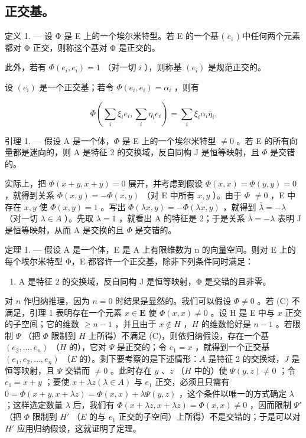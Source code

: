 \subsection{正交基。}

定义 1. --- 设 Φ 是 E 上的一个埃尔米特型。若 E 的一个基 ( \(e_{i}\) ) 中任何两个元素都对 Φ 正交，则称这个基对 Φ 是正交的。

此外，若有 \(\Phi(e_i, e_i) = 1\) （对一切 \(i\) ），则称基 \((e_i)\) 是规范正交的。

设 \((e_i)\) 是一个正交基；若令 \(\Phi(e_i, e_i) = \alpha_i\) ，则有

\[
\Phi (\sum_ {i} \xi_ {i} e _ {i}, \sum_ {i} \eta_ {i} e _ {i}) = \sum_ {i} \xi_ {i} \alpha_ {i} \overline {{\eta}} _ {i}.\tag{1}
\]

引理 1. --- 假设 A 是一个体，\(\Phi\) 是 E 上的一个埃尔米特型 \(\neq 0\) 。若 E 的所有向量都是迷向的，则 A 是特征 2 的交换域，反自同构 J 是恒等映射，且 \(\Phi\) 是交错的。

实际上，把 \(\Phi(x+y, x+y)=0\) 展开，并考虑到假设 \(\Phi(x,x)=\Phi(y,y)=0\) ，就得到关系 \(\Phi(x,y)=-\overline{\Phi(x,y)}\) （对 E 中所有 \(x,y\) ）。由于 \(\Phi\) \(\neq 0\) ，E 中存在 \(x,y\) 使 \(\Phi(x,y)=1\) 。写出 \(\Phi(\lambda x,y)=-\overline{\Phi(\lambda x,y)}\) ，就得到 \(\bar{\lambda}=-\lambda\) （对一切 \(\lambda\in A\) ）。先取 \(\lambda=1\) ，就看出 A 的特征是 2；于是关系 \(\bar{\lambda}=-\lambda\) 表明 J 是恒等映射，从而 A 是交换的且 \(\Phi\) 是交错的。

定理 1. --- 假设 A 是一个体，E 是 A 上有限维数为 n 的向量空间。则对 E 上的每个埃尔米特型 Φ，E 都容许一个正交基，除非下列条件同时满足：

\begin{enumerate}
\def\labelenumi{(\Alph{enumi})}
\setcounter{enumi}{2}
\tightlist
\item
  A 是特征 2 的交换域，反自同构 J 是恒等映射，Φ 是交错的且非零。
\end{enumerate}

对 \(n\) 作归纳推理，因为 \(n=0\) 时结果是显然的。我们可以假设 \(\Phi\neq0\) 。若 (C) 不满足，引理 1 表明存在一个元素 \(x\in\mathbf{E}\) 使 \(\Phi(x,x)\neq0\) 。设 H 是 E 中与 \(x\) 正交的子空间；它的维数 \(\geqslant n-1\) ，并且由于 \(x \notin H\) ，\(H\) 的维数恰好是 \(n-1\) 。若限制 \(\Psi\) （把 \(\Phi\) 限制到 \(H\) 上所得）不满足 (C)，则依归纳假设，存在一个基 \((e_2, \ldots, e_n)\) （\(H\) 的），它对 \(\Psi\) 是正交的；令 \(e_1 = x\) ，就得到一个正交基 \((e_1, e_2, \ldots, e_n)\) （\(E\) 的）。剩下要考察的是下述情形：\(A\) 是特征 2 的交换域，\(J\) 是恒等映射，且 \(\Psi\) 交错而 \(\neq 0\) 。此时存在 \(y\) 、\(z\) （\(H\) 中的）使 \(\Psi(y, z) \neq 0\) ；令 \(e_1 = x + y\) ；要使 \(x + \lambda z (\lambda \in A)\) 与 \(e_1\) 正交，必须且只需有 \(0 = \Phi(x + y, x + \lambda z) = \Phi(x, x) + \lambda \Psi(y, z)\) ，这个条件以唯一的方式确定 \(\lambda\) ；这样选定数量 \(\lambda\) 后，我们有 \(\Phi(x + \lambda z, x + \lambda z) = \Phi(x, x) \neq 0\) ，因而限制 \(\Psi'\) （把 \(\Phi\) 限制到 \(H'\) （\(E\) 的与 \(e_1\) 正交的子空间）上所得）不是交错的；于是可以对 \(H'\) 应用归纳假设，这就证明了定理。


